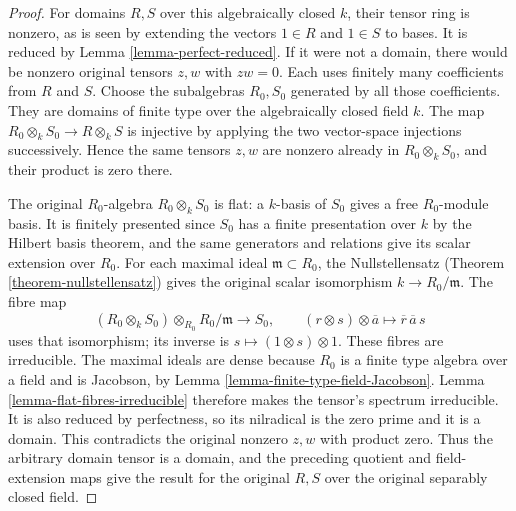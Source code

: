 \begin{proof}
For domains $R,S$ over this
algebraically closed $k$, their
tensor ring is nonzero, as is
seen by extending the vectors
$1\in R$ and $1\in S$ to bases.
It is reduced by Lemma
\ref{lemma-perfect-reduced}.
If it were not a domain, there
would be nonzero original tensors
$z,w$ with $zw=0$. Each uses
finitely many coefficients from
$R$ and $S$. Choose the subalgebras
$R_0,S_0$ generated by all those
coefficients. They are domains
of finite type over the
algebraically closed field $k$.
The map $R_0\otimes_k S_0\to R\otimes_k S$
is injective by applying the
two vector-space injections
successively. Hence the same
tensors $z,w$ are nonzero already
in $R_0\otimes_k S_0$, and
their product is zero there.

The original $R_0$-algebra
$R_0\otimes_k S_0$ is flat:
a $k$-basis of $S_0$ gives a
free $R_0$-module basis.
It is finitely presented since
$S_0$ has a finite presentation
over $k$ by the Hilbert basis
theorem, and the same generators
and relations give its scalar
extension over $R_0$.
For each maximal ideal
$\mathfrak m\subset R_0$, the
Nullstellensatz (Theorem \ref{theorem-nullstellensatz}) gives the
original scalar isomorphism
$k\to R_0/\mathfrak m$.
The fibre map
$$
(R_0\otimes_k S_0)\otimes_{R_0}R_0/\mathfrak m
\longrightarrow S_0,
\qquad(r\otimes s)\otimes\overline a
\longmapsto\overline r\,\overline a\,s
$$
uses that isomorphism; its
inverse is $s\mapsto(1\otimes s)\otimes1$.
These fibres are irreducible.
The maximal ideals are dense
because $R_0$ is a finite type
algebra over a field and is
Jacobson, by Lemma
\ref{lemma-finite-type-field-Jacobson}.
Lemma \ref{lemma-flat-fibres-irreducible}
therefore makes the tensor's
spectrum irreducible. It is
also reduced by perfectness,
so its nilradical is the zero
prime and it is a domain.
This contradicts the original
nonzero $z,w$ with product zero.
Thus the arbitrary domain tensor
is a domain, and the preceding
quotient and field-extension
maps give the result for the
original $R,S$ over the original
separably closed field.
\end{proof}